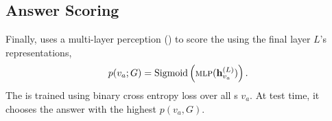 \subsection{Answer Scoring}
\label{sec:ans}

Finally, \name{} uses a multi-layer perception () to score the \rightnode{} using the
final layer $L$'s representations,
\begin{equation}
p({v_a; G}) = \mbox{Sigmoid{}}\left(\mbox{\textsc{mlp}}(\mathbf{h}^{(L)}_{v_a})\right).
\label{eq:node-update}
\end{equation}
The  is trained using binary cross entropy
loss over all \rightnode{}s $v_a$.  At test time, it
chooses the answer with the highest $p({v_a, G})$.